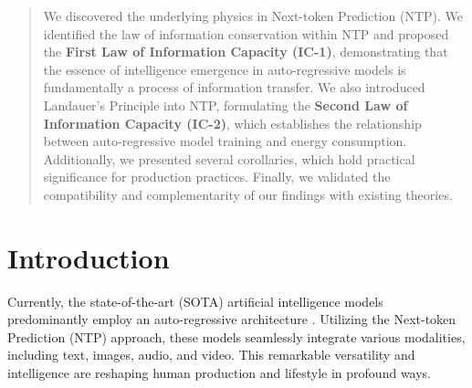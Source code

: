\documentclass{article}
\theoremstyle{plain}
\theoremstyle{definition}
\theoremstyle{remark}
\begin{document}
\printAffiliationsAndNotice{\icmlEqualContribution} %

\begin{abstract}
We discovered the underlying physics in Next-token Prediction (NTP). We identified the law of information conservation within NTP and proposed the \textbf{First Law of Information Capacity (IC-1)}, demonstrating that the essence of intelligence emergence in auto-regressive models is fundamentally a process of information transfer. We also introduced Landauer's Principle into NTP, formulating the \textbf{Second Law of Information Capacity (IC-2)}, which establishes the relationship between auto-regressive model training and energy consumption. Additionally, we presented several corollaries, which hold practical significance for production practices. Finally, we validated the compatibility and complementarity of our findings with existing theories.
\end{abstract}

\section{Introduction}

Currently, the state-of-the-art (SOTA) artificial intelligence models predominantly employ an auto-regressive architecture \cite{GPTo1_2024}. Utilizing the Next-token Prediction (NTP) approach, these models seamlessly integrate various modalities, including text, images, audio, and video. This remarkable versatility and intelligence are reshaping human production and lifestyle in profound ways.
\end{document}
